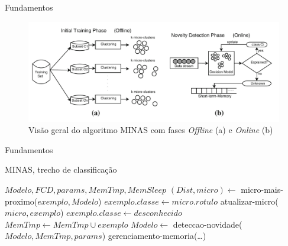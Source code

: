 \documentclass[aspectratio=43,10pt]{beamer}
\newcommand{\nota}[1]{\hspace*{-0.5cm}\textit{{\color[rgb]{1,0,0}Nota: #1}}}
\begin{document}
\begin{frame}[fragile]{Fundamentos}
  \begin{figure}[ht]
    \centering
    \includegraphics[width=\textwidth]{figuras/FariaMinas2015-fases.png}
    \caption{Visão geral do algoritmo MINAS com fases \emph{Offline} (a) e 
    \emph{Online} (b) \cite{Faria2016minas}}
    \label{fig:minas}
  \end{figure}
\end{frame}

\begin{frame}[fragile]{Fundamentos}
  \begin{algorithm}[H]
    \caption{MINAS, trecho de classificação}
    \label{alg:MINAS}
    \renewcommand{\algorithmicrequire}{\textbf{Entrada:}}
    \begin{algorithmic}[1]
      \REQUIRE $Modelo,FCD,params,MemTmp,MemSleep$
      \STATE $(Dist,micro) \leftarrow$ micro-mais-proximo($exemplo,Modelo$)
      \STATE $exemplo.classe \leftarrow micro.rotulo$
      \STATE atualizar-micro($micro,exemplo$)
      \ELSE
      \STATE $exemplo.classe \leftarrow desconhecido$
      \STATE $MemTmp \leftarrow MemTmp \cup exemplo$
      \STATE $Modelo \leftarrow $ deteccao-novidade($Modelo,MemTmp,params$)
      \ENDIF
      \ENDIF
      \STATE gerenciamento-memoria(\dots)
      \ENDFOR
    \end{algorithmic}
  \end{algorithm}
\end{frame}
\end{document}
